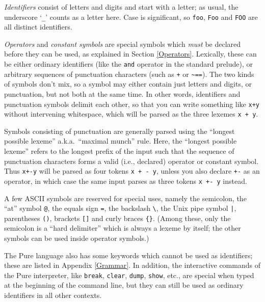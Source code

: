 \documentclass[a4paper,12pt]{article}
\begin{document}
\emph{Identifiers} consist of letters and digits and start with a letter; as usual, the underscore `\verb|_|' counts as a letter here. Case is significant, so \lstinline|foo|, \lstinline|Foo| and \lstinline|FOO| are all distinct identifiers.

\emph{Operators} and \emph{constant symbols} are special symbols which \emph{must} be declared before they can be used, as explained in Section \ref{Operators}. Lexically, these can be either ordinary identifiers (like the \lstinline|and| operator in the standard prelude), or arbitrary sequences of punctuation characters (such as \lstinline|+| or \lstinline|~==|). The two kinds of symbols don't mix, so a symbol may either contain just letters and digits, or punctuation, but not both at the same time. In other words, identifiers and punctuation symbols delimit each other, so that you can write something like \lstinline|x+y| without intervening whitespace, which will be parsed as the three lexemes \lstinline|x + y|.

Symbols consisting of punctuation are generally parsed using the ``longest possible lexeme'' a.k.a.\ ``maximal munch'' rule. Here, the ``longest possible lexeme'' refers to the longest prefix of the input such that the sequence of punctuation characters forms a valid (i.e., declared) operator or constant symbol. Thus \lstinline|x+-y| will be parsed as four tokens \lstinline|x + - y|, unless you also declare \lstinline|+-| as an operator, in which case the same input parses as three tokens \lstinline|x +- y| instead.

A few ASCII symbols are reserved for special uses, namely the semicolon, the ``at'' symbol \verb|@|, the equals sign \verb|=|, the backslash \verb|\|, the Unix pipe symbol \verb?|?, parentheses \verb|()|, brackets \verb|[]| and curly braces \verb|{}|. (Among these, only the semicolon is a ``hard delimiter'' which is always a lexeme by itself; the other symbols can be used inside operator symbols.)

The Pure language also has some keywords which cannot be used as identifiers; these are listed in Appendix \ref{Grammar}. In addition, the interactive commands of the Pure interpreter, like \verb|break|, \verb|clear|, \verb|dump|, \verb|show|, etc., are special when typed at the beginning of the command line, but they can still be used as ordinary identifiers in all other contexts.
\end{document}
